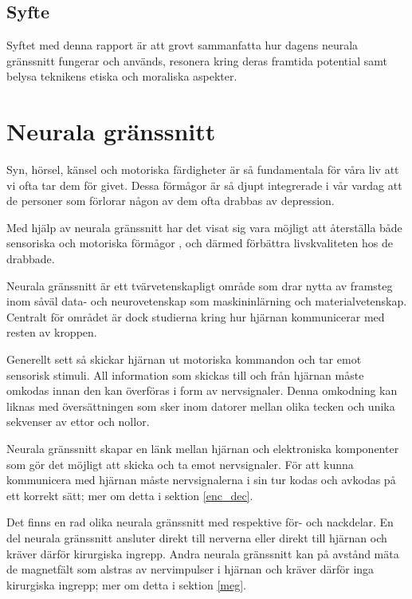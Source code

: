 \documentclass[12pt, a4paper]{article}
\begin{document}
\subsection{Syfte}

Syftet med denna rapport är att grovt sammanfatta hur dagens neurala gränssnitt
fungerar och används, resonera kring deras framtida potential samt belysa
teknikens etiska och moraliska aspekter.


\section{Neurala gränssnitt}

Syn, hörsel, känsel och motoriska färdigheter är så fundamentala för våra liv
att vi ofta tar dem för givet. Dessa förmågor är så djupt integrerade i vår
vardag att de personer som förlorar någon av dem ofta drabbas av depression.
\cite{depression}

Med hjälp av neurala gränssnitt har det visat sig vara möjligt att återställa
både sensoriska \cite{sight1,sound,touch} och motoriska förmågor
\cite{prosthetic_operation}, och därmed förbättra livskvaliteten hos de
drabbade.

Neurala gränssnitt är ett tvärvetenskapligt område som drar nytta av framsteg
inom såväl data- och neurovetenskap som maskininlärning och materialvetenskap.
Centralt för området är dock studierna kring hur hjärnan kommunicerar med resten
av kroppen.

Generellt sett så skickar hjärnan ut motoriska kommandon och tar emot sensorisk
stimuli. All information som skickas till och från hjärnan måste omkodas innan
den kan överföras i form av nervsignaler. Denna omkodning kan liknas med
översättningen som sker inom datorer mellan olika tecken och unika sekvenser av
ettor och nollor.

Neurala gränssnitt skapar en länk mellan hjärnan och elektroniska komponenter
som gör det möjligt att skicka och ta emot nervsignaler. För att kunna
kommunicera med hjärnan måste nervsignalerna i sin tur kodas och avkodas på ett
korrekt sätt; mer om detta i sektion \ref{enc_dec}.


Det finns en rad olika neurala gränssnitt med respektive för- och nackdelar. En
del neurala gränssnitt ansluter direkt till nerverna eller direkt till hjärnan
och kräver därför kirurgiska ingrepp. Andra neurala gränssnitt kan på avstånd
mäta de magnetfält som alstras av nervimpulser i hjärnan och kräver därför inga
kirurgiska ingrepp; mer om detta i sektion \ref{meg}.
\end{document}
